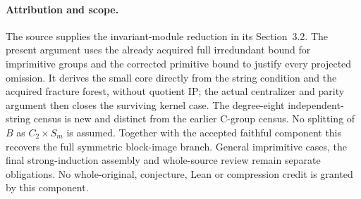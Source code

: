 \documentclass[11pt,a4paper]{article}
\begin{document}
\paragraph{Attribution and scope.}
The source supplies the invariant-module reduction in its
Section~3.2. The present argument uses the already acquired
full irredundant bound for imprimitive groups and the corrected
primitive bound to justify every projected omission. It derives
the small core directly from the string condition and the
acquired fracture forest, without quotient IP; the actual
centralizer and parity argument then closes the surviving
kernel case. The degree-eight independent-string census is
new and distinct from the earlier C-group census. No splitting
of $B$ as $C_2\times S_m$ is assumed. Together with the
accepted faithful component this recovers the full symmetric
block-image branch. General imprimitive cases, the final
strong-induction assembly and whole-source review remain
separate obligations. No whole-original, conjecture, Lean or
compression credit is granted by this component.
\end{document}
